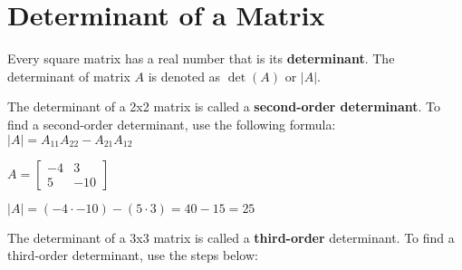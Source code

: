\documentclass{report}
\begin{document}

\section{Determinant of a Matrix}

Every square matrix has a real number that is its \textbf{determinant}. The determinant of matrix $A$ is denoted as $\det(A)$ or $|A|$.

The determinant of a 2x2 matrix is called a \textbf{second-order determinant}. To find a second-order determinant, use the following formula: $|A|=A_{11}A_{22}-A_{21}A_{12}$

 {
    $
        A=
        \begin{bmatrix}
            -4 & 3 \\
            5 & -10
        \end{bmatrix}
    $

    $|A|=(-4 \cdot -10)-(5 \cdot 3)=40-15=25$
}

The determinant of a 3x3 matrix is called a \textbf{third-order} determinant. To find a third-order determinant, use the steps below:
\end{document}
